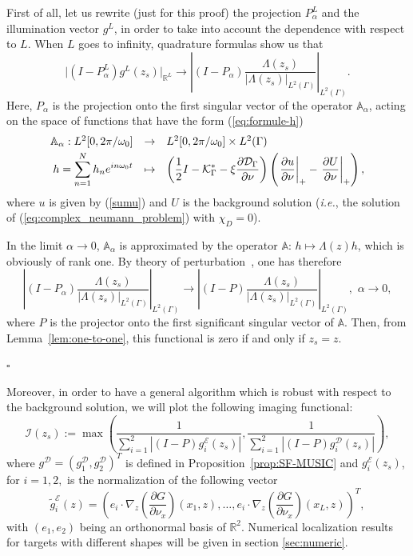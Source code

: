 \documentclass[final]{siamltex}
\newcommand{\ds}{\displaystyle}
\newcommand{\nm}{\noalign{\smallskip}}
\numberwithin{equation}{section}
\numberwithin{figure}{section}
\numberwithin{table}{section}
\newcommand{\cqfd}{\hfill $\square$}
\begin{document}
\proof

First of all, let us rewrite (just for this proof) the projection
$P_{\alpha}^{L}$ and the illumination vector $g^{L}$, in order to
take into account the dependence with respect to $L$. When $L$
goes to infinity, quadrature formulas show us that
\[
\vert(I-P_{\alpha}^{L})g^{L}(z_{s})\vert_{\mathbb{R}^{L}}\rightarrow\left|(I-P_{\alpha})
\frac{\Lambda(z_{s})}{\vert\Lambda(z_{s})\vert_{L^{2}(\Gamma)}}\right|_{L^{2}(\Gamma)}.
\]
Here, $P_{\alpha}$ is the projection onto the first singular
vector of the operator $\mathbb{A}_{\alpha}$, acting on the space
of functions that have the form  (\ref{eq:formule-h})
\[\begin{array}{rll}
\mathbb{A}_{\alpha}:  L^2[0, {2\pi}/{\omega_0}] &\rightarrow & L^2[0, {2\pi}/{\omega_0}] \times L^2(\Gamma) \\
\nm
\ds h = \sum_{n=1}^N h_n e^{i n \omega_0 t} &\mapsto&  \ds
\left(\frac{1}{2}I-\mathcal{K}_{\Gamma}^{*}
-\xi\frac{\partial\mathcal{D}_{\Gamma}}{\partial\nu}\right)\left(\left.\frac{\partial
u}{\partial\nu}\right|_{+}-\left.\frac{\partial
U}{\partial\nu}\right|_{+}\right),
\end{array}
\]
where $u$ is given by (\ref{sumu}) and $U$ is the background
solution ({\it i.e.}, the solution of
(\ref{eq:complex_neumann_problem}) with $\chi_D=0$).


In the limit $\alpha \rightarrow0$, $\mathbb{A}_{\alpha}$ is
approximated by the operator $\mathbb{A}:\, h\mapsto\Lambda(z)h$,
which is obviously of rank one. By theory of
perturbation~\cite{kato1976perturbation}, one has therefore
\[
\left|(I-P_{\alpha})\frac{\Lambda(z_{s})}{\vert\Lambda(z_{s})\vert_{L^{2}(\Gamma)}}
\right|_{L^{2}(\Gamma)}\rightarrow\left|(I-P)\frac{\Lambda(z_{s})}{\vert\Lambda(z_{s})
\vert_{L^{2}(\Gamma)}}\right|_{L^{2}(\Gamma)},\,\,\alpha\rightarrow0,
\]
where $P$ is the projector onto the first significant singular
vector of $\mathbb{A}$. Then, from Lemma~\ref{lem:one-to-one},
this functional is zero if and only if $z_{s}=z$.

\cqfd

Moreover, in order to have a general algorithm which is robust
with respect to the background solution, we will plot the
following imaging functional:
\begin{equation} \label{musicf}
\mathcal{I}(z_{s}):=\max\left(\frac{1}{ \sum_{i=1}^2
\left|(I-P)g_i^{\mathcal{E}}(z_{s})\right|}, \frac{1}{\sum_{i=1}^2
\left|(I-P)g_i^{\mathcal{D}}(z_{s})\right|}\right),
\end{equation}
where $g^{\mathcal{D}} =(g_1^{\mathcal{D}}, g_2^{\mathcal{D}})^T$
is defined in Proposition~\ref{prop:SF-MUSIC} and
$g_i^{\mathcal{E}}(z_{s})$, for $i=1,2,$ is the normalization of
the following vector
\[
\tilde{g}_i^{\mathcal{E}}(z)=\left( e_i \cdot
\nabla_{z}\left(\frac{\partial
G}{\partial\nu_{x}}\right)(x_{1},z),\ldots, e_i \cdot
\nabla_{z}\left(\frac{\partial
G}{\partial\nu_{x}}\right)(x_{L},z)\right)^{T},
\]
with $(e_1,e_2)$ being an orthonormal  basis of $\mathbb{R}^{2}$.
Numerical localization results for targets with different shapes
will be given in section \ref{sec:numeric}.
\end{document}
